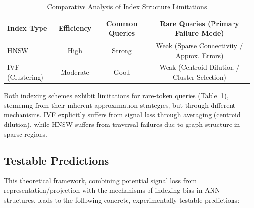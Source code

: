 \documentclass[manuscript]{acmart}
\begin{document}
\begin{table}[h!]
  \centering
  \begin{tabular}{lccc}
    \toprule
    Index Type & Efficiency & Common Queries & Rare Queries (Primary Failure Mode) \\
    \midrule
    HNSW & High & Strong & Weak (Sparse Connectivity / Approx. Errors) \\
    IVF (Clustering) & Moderate & Good & Weak (Centroid Dilution / Cluster Selection) \\
    \bottomrule
  \end{tabular}
  \caption{Comparative Analysis of Index Structure Limitations}
  \label{tab:comparison_revised}
\end{table}

Both indexing schemes exhibit limitations for rare-token queries (Table~\ref{tab:comparison_revised}), stemming from their inherent approximation strategies, but through different mechanisms. IVF explicitly suffers from signal loss through averaging (centroid dilution), while HNSW suffers from traversal failures due to graph structure in sparse regions.

\subsection{Testable Predictions} %

This theoretical framework, combining potential signal loss from representation/projection with the mechanisms of indexing bias in ANN structures, leads to the following concrete, experimentally testable predictions:
\end{document}
